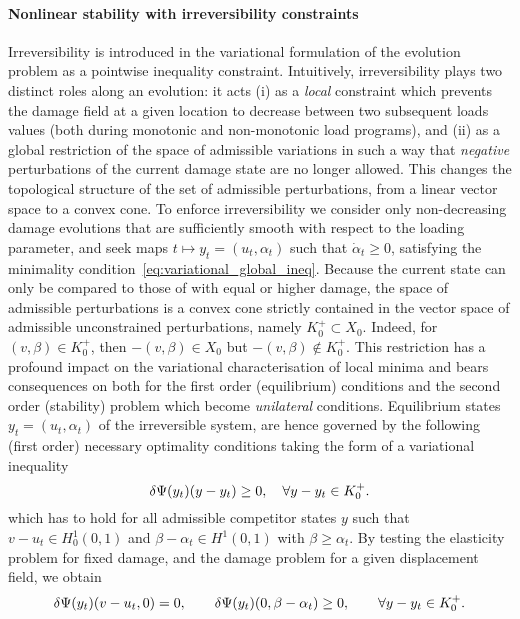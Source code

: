 % 

\paragraph{Nonlinear stability with irreversibility constraints}

Irreversibility is introduced in the variational formulation of the evolution problem as a pointwise inequality constraint. Intuitively, irreversibility plays two distinct roles along an evolution: it acts (i) as a \emph{local} constraint which prevents the damage field at a given location to decrease between two subsequent loads values (both during monotonic and non-monotonic load programs), and (ii) as a global restriction of the space of admissible variations in such a way that \emph{negative} perturbations of the current damage state are no longer allowed. This changes the topological structure of the set of admissible perturbations, from a linear vector space to a convex cone. 
To enforce irreversibility we consider only non-decreasing damage evolutions that are sufficiently smooth with respect to the loading parameter, and seek maps $t\mapsto y_t = (u_t, \alpha_t)$ such that $\dot \alpha_t \geq 0$,  satisfying the minimality condition~\eqref{eq:variational_global_ineq}.
Because the current state can only be compared to those of with equal or higher damage, the space of admissible perturbations is a  convex cone strictly contained in the vector space of admissible unconstrained perturbations, namely $K^+_0\subset X_0$. Indeed, for $(v, \beta)\in K^+_0$, then $-(v, \beta) \in X_0$ but $-(v, \beta)\notin K^+_0$. This restriction has a profound impact on the variational characterisation of local minima and bears consequences on both for the first order (equilibrium) conditions and the second order (stability) problem which become \emph{unilateral} conditions.
Equilibrium states $y_t=(u_t, \alpha_t)$ of the irreversible system, are hence governed by the following (first order) necessary optimality conditions taking the form of a variational inequality
\begin{equation}
    \label{eq:eq_variational_inequality_full}
    \delta \Psi(y_t)(y-y_t) \geq 0, \quad \forall y-y_t \in K^+_0.
\end{equation}
% 
which has to hold for all admissible competitor states $y$ such that $v-u_t \in H^1_0(0, 1)$ and $\beta-\alpha_t\in H^1(0,1)$ with $\beta \geq \alpha_t$.
By testing the elasticity problem for fixed damage, and the damage problem for a given displacement field, we obtain 
\begin{equation}
    \label{eq:variational_equilibrium} 
    \delta \Psi(y_t)(v-u_t, 0) = 0, \qquad \delta \Psi(y_t)(0, \beta-\alpha_t) \geq 0, \qquad \forall y-y_t \in K^+_{0}.
\end{equation}

